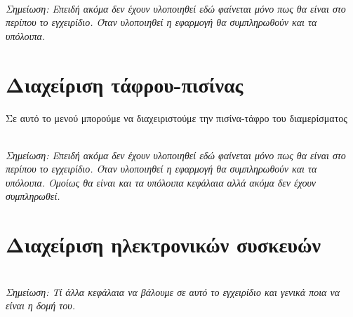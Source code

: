 \documentclass[a4paper,titlepage,twoside,12pt,leqno]{article}
\begin{document}
\emph{\\Σημείωση: Επειδή ακόμα δεν έχουν υλοποιηθεί εδώ φαίνεται μόνο πως θα είναι στο περίπου το εγχειρίδιο. Όταν υλοποιηθεί η εφαρμογή θα συμπληρωθούν και τα υπόλοιπα.\\}

\section{Διαχείριση τάφρου-πισίνας}
\label{pisina}

Σε αυτό το μενού μπορούμε να διαχειριστούμε την πισίνα-τάφρο του διαμερίσματος

\emph{\\Σημείωση: Επειδή ακόμα δεν έχουν υλοποιηθεί εδώ φαίνεται μόνο πως θα είναι στο περίπου το εγχειρίδιο. Όταν υλοποιηθεί η εφαρμογή θα συμπληρωθούν και τα υπόλοιπα. Ομοίως θα είναι και τα υπόλοιπα κεφάλαια αλλά ακόμα δεν έχουν συμπληρωθεί.\\}

\section{Διαχείριση ηλεκτρονικών συσκευών}
\label{syskeuves}


\emph{\\Σημείωση: Τί άλλα κεφάλαια να βάλουμε σε αυτό το εγχειρίδιο και γενικά ποια να είναι η δομή του.\\}
\end{document}
